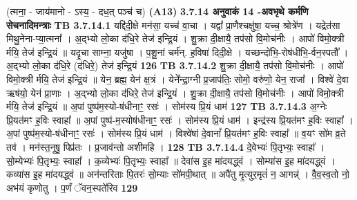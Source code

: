 \documentclass[17pt]{extarticle}
\begin{document}
{{{{{{{{{{{{{{{{{{{                  \newline
                                    (त्मना॒ - जाय॑मानो - ऽस्य॒ - दध॒त् पञ्च॑ च) \textbf{(A13)} \newline \newline
                \textbf{ 3.7.14    अनुवाकं   14 -अवभृथे कर्मणि सेचनादिमन्त्राः} \newline
                                \textbf{ TB 3.7.14.1} \newline
                  यद्दि॑दी॒क्षे मन॑सा॒ यच्च॑ वा॒चा । यद्वा᳚ प्रा॒णैश्चक्षु॑षा॒ यच्च॒ श्रोत्रे॑ण । यद्रेत॑सा मिथु॒नेना-प्या॒त्मना᳚ । अ॒द्भ्यो लो॒का द॑धि॒रे तेज॑ इन्द्रि॒यं । शु॒क्रा दी॒क्षायै॒ तप॑सो वि॒मोच॑नीः । आपो॑ विमो॒क्त्री र्मयि॒ तेज॑ इन्द्रि॒यं ॥ यदृ॒चा साम्ना॒ यजु॑षा । प॒शू॒नां चर्म॑न्. ह॒विषा॑ दिदी॒क्षे । यच्छन्दो॑भि॒-रोष॑धीभि॒-र्वन॒स्पतौ᳚ । अ॒द्भ्यो लो॒का द॑धि॒रे (द॑धिरे॒) तेज॑ इन्द्रि॒यं \textbf{ 126} \newline
                  \newline
                                \textbf{ TB 3.7.14.2} \newline
                  शु॒क्रा दी॒क्षायै॒ तप॑सो वि॒मोच॑नीः । आपो॑ विमो॒क्त्री र्मयि॒ तेज॑ इन्द्रि॒यं ॥ येन॒ ब्रह्म॒ येन॑ क्ष॒त्रं । येने᳚न्द्रा॒ग्नी प्र॒जाप॑तिः॒ सोमो॒ वरु॑णो॒ येन॒ राजा᳚ । विश्वे॑ दे॒वा ऋष॑यो॒ येन॑ प्रा॒णाः । अ॒द्भ्यो लो॒का द॑धिरे॒ तेज॑ इन्द्रि॒यं । शु॒क्रा दी॒क्षायै॒ तप॑सो वि॒मोच॑नीः । आपो॑ विमो॒क्त्री र्मयि॒ तेज॑ इन्द्रि॒यं ॥ अ॒पां पुष्प॑म॒स्यो-ष॑धीनाꣳ॒॒ रसः॑ । सोम॑स्य प्रि॒यं धाम॑ \textbf{ 127} \newline
                  \newline
                                \textbf{ TB 3.7.14.3} \newline
                  अ॒ग्नेः प्रि॒यत॑मꣳ ह॒विः स्वाहा᳚ ॥ अ॒पां पुष्प॑-म॒स्योष॑धीनाꣳ॒॒ रसः॑ । सोम॑स्य प्रि॒यं धाम॑ । इन्द्र॑स्य प्रि॒यत॑मꣳ ह॒विः स्वाहा᳚ । अ॒पां पुष्प॑म॒स्यो-ष॑धीनाꣳ॒॒ रसः॑ । सोम॑स्य प्रि॒यं धाम॑ । विश्वे॑षां दे॒वानां᳚ प्रि॒यत॑मꣳ ह॒विः स्वाहा᳚ ॥ व॒यꣳ सो॑म व्र॒ते तव॑ । मन॑स्त॒नूषु॒ पिप्र॑तः । प्र॒जाव॑न्तो अशीमहि । \textbf{ 128} \newline
                  \newline
                                \textbf{ TB 3.7.14.4} \newline
                  दे॒वेभ्यः॑ पि॒तृभ्यः॒ स्वाहा᳚ । सो॒म्येभ्यः॑ पि॒तृभ्यः॒ स्वाहा᳚ । क॒व्येभ्यः॑ पि॒तृभ्यः॒ स्वाहा᳚ ॥ देवा॑स इ॒ह मा॑दयद्ध्वं । सोम्या॑स इ॒ह मा॑दयद्ध्वं । कव्या॑स इ॒ह मा॑दयद्ध्वं ॥ अन॑न्तरिताः पि॒तरः॑ सो॒म्याः सो॑मपी॒थात् ॥ अपै॑तु मृ॒त्युर॒मृतं॑ न॒ आगन्न्॑ । वै॒व॒स्व॒तो नो॒ अभ॑यं कृणोतु । प॒र्णं ॅवन॒स्पते॑रिव \textbf{ 129} \newline
}}}}}}}}}}}}}}}}}}}
\end{document}
